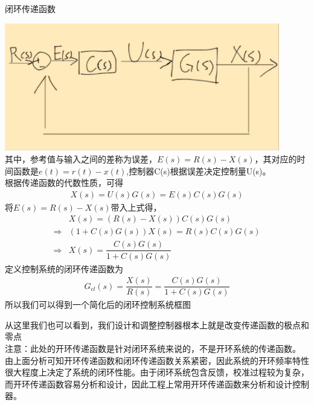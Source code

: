 \documentclass[UTF8,a4paper,12pt]{ctexart}
\begin{document}
  \begin{titlebox}{闭环传递函数}
    \par \includegraphics[width=12cm]{picture/feedback control.png}
    \\其中，参考值与输入之间的差称为误差，$E(s)=R(s)-X(s)$，其对应的时间函数是$e(t)=r(t)-x(t)$,控制器C(s)根据误差决定控制量U(s)。
    \\根据传递函数的代数性质，可得
    \begin{align*}
      X(s)=U(s)G(s)=E(s)C(s)G(s)
    \end{align*}
    将$E(s)=R(s)-X(s)$带入上式得，
    \begin{align*}
      &X(s)=(R(s)-X(s))C(s)G(s)\\
      \Rightarrow&(1+C(s)G(s))X(s)=R(s)C(s)G(s)\\
      \Rightarrow&X(s)=\dfrac{C(s)G(s)}{1+C(s)G(s)}
    \end{align*}
    定义控制系统的闭环传递函数为
    \begin{align*}
      G_{cl}(s)=\dfrac{X(s)}{R(s)}=\dfrac{C(s)G(s)}{1+C(s)G(s)}
    \end{align*}
    所以我们可以得到一个简化后的闭环控制系统框图\\
    \begin{center}
    \end{center}
    从这里我们也可以看到，我们设计和调整控制器根本上就是改变传递函数的极点和零点\\
    注意：此处的开环传递函数是针对闭环系统来说的，不是开环系统的传递函数。\\
    由上面分析可知开环传递函数和闭环传递函数关系紧密，因此系统的开环频率特性很大程度上决定了系统的闭环性能。由于闭环系统包含反馈，校准过程较为复杂，而开环传递函数容易分析和设计，因此工程上常用开环传递函数来分析和设计控制器。\label{sec:part1}
  \end{titlebox}
    
\end{document}
